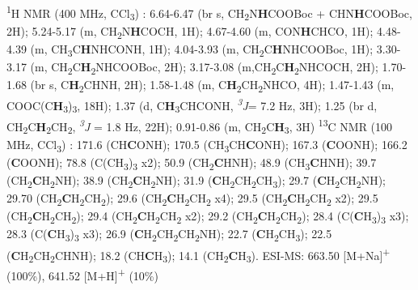 \textsuperscript{1}H NMR (400 MHz, CCl\textsubscript{3}) \textdelta:  
6.64-6.47 (br s, CH\textsubscript{2}N\textbf{H}COOBoc + CHN\textbf{H}COOBoc, 2H); 5.24-5.17 (m, CH\textsubscript{2}N\textbf{H}COCH, 1H); 4.67-4.60 (m, CON\textbf{H}CHCO, 1H); 4.48-4.39 (m, CH\textsubscript{3}C\textbf{H}NHCONH, 1H); 4.04-3.93 (m, CH\textsubscript{2}C\textbf{H}NHCOOBoc, 1H); 3.30-3.17 (m, CH\textsubscript{2}C\textbf{H}\textsubscript{2}NHCOOBoc, 2H);
3.17-3.08 (m,CH\textsubscript{2}C\textbf{H}\textsubscript{2}NHCOCH, 2H); 1.70-1.68 (br s, C\textbf{H}\textsubscript{2}CHNH, 2H); 1.58-1.48 (m, C\textbf{H}\textsubscript{2}CH\textsubscript{2}NHCO, 4H); 1.47-1.43 (m, COOC(C\textbf{H}\textsubscript{3})\textsubscript{3}, 18H); 1.37 (d, C\textbf{H}\textsubscript{3}CHCONH, \textit{\textsuperscript{3}J}= 7.2 Hz, 3H); 1.25 (br d, CH\textsubscript{2}C\textbf{H}\textsubscript{2}CH\textsubscript{2}, \textit{\textsuperscript{3}J} = 1.8 Hz, 22H);  0.91-0.86 (m, CH\textsubscript{2}C\textbf{H}\textsubscript{3}, 3H)
\newline
\textsuperscript{13}C NMR (100 MHz, CCl\textsubscript{3}) \textdelta:
171.6 (CH\textbf{C}ONH); 170.5 (CH\textsubscript{3}CH\textbf{C}ONH); 167.3 (\textbf{C}OONH); 166.2 (\textbf{C}OONH); 78.8 (C(CH\textsubscript{3})\textsubscript{3} x2); 50.9 (CH\textsubscript{2}\textbf{C}HNH); 48.9 (CH\textsubscript{3}\textbf{C}HNH); 39.7 (CH\textsubscript{2}\textbf{C}H\textsubscript{2}NH); 38.9 (CH\textsubscript{2}\textbf{C}H\textsubscript{2}NH); 31.9 (\textbf{C}H\textsubscript{2}CH\textsubscript{2}CH\textsubscript{3}); 29.7 (\textbf{C}H\textsubscript{2}CH\textsubscript{2}NH); 29.70 (CH\textsubscript{2}\textbf{C}H\textsubscript{2}CH\textsubscript{2}); 29.6 (CH\textsubscript{2}\textbf{C}H\textsubscript{2}CH\textsubscript{2} x4); 29.5 (CH\textsubscript{2}\textbf{C}H\textsubscript{2}CH\textsubscript{2} x2); 29.5 (CH\textsubscript{2}\textbf{C}H\textsubscript{2}CH\textsubscript{2}); 29.4 (CH\textsubscript{2}\textbf{C}H\textsubscript{2}CH\textsubscript{2} x2); 29.2 (CH\textsubscript{2}\textbf{C}H\textsubscript{2}CH\textsubscript{2}); 28.4 (C(\textbf{C}H\textsubscript{3})\textsubscript{3} x3); 28.3 (C(\textbf{C}H\textsubscript{3})\textsubscript{3} x3); 26.9 (\textbf{C}H\textsubscript{2}CH\textsubscript{2}CH\textsubscript{2}NH); 22.7 (\textbf{C}H\textsubscript{2}CH\textsubscript{3}); 22.5 (\textbf{C}H\textsubscript{2}CH\textsubscript{2}CHNH); 18.2 (CH\textbf{C}H\textsubscript{3}); 14.1 (CH\textsubscript{2}\textbf{C}H\textsubscript{3}). 
\newline
ESI-MS:  663.50 [M+Na]\textsuperscript{+} (100\%), 641.52 [M+H]\textsuperscript{+} (10\%)
